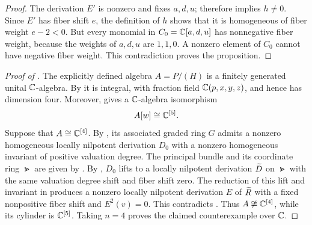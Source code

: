 \begin{proof}
The derivation $E'$ is nonzero and fixes $a,d,u$; therefore
 implies $h\ne0$.  Since $E'$ has fiber
shift $e$, the definition of $h$ shows that it is homogeneous
of fiber weight $e-2<0$.  But every monomial in
$C_0=\mathbb C[a,d,u]$ has nonnegative fiber weight, because the
weights of $a,d,u$ are $1,1,0$.  A nonzero element of $C_0$
cannot have negative fiber weight.  This contradiction proves
the proposition.
\end{proof}

\begin{proof}[Proof of ]
The explicitly defined algebra $A=P/(H)$ is a finitely
generated unital $\mathbb C$-algebra.  By  it is
integral, with fraction field $\mathbb C(p,x,y,z)$, and hence has
dimension four.  Moreover, 
gives a $\mathbb C$-algebra isomorphism
\[
 A[w]\cong\mathbb C^{[5]}.
\]
Suppose that $A\cong\mathbb C^{[4]}$.  By
, its associated
graded ring $G$ admits a nonzero homogeneous locally nilpotent
derivation $D_0$ with a nonzero homogeneous invariant of
positive valuation degree.  The principal bundle and its
coordinate ring $\Gt$ are given by
.  By
, $D_0$ lifts to a locally
nilpotent derivation $\widetilde D$ on $\Gt$ with the same valuation
degree shift and fiber shift zero.  The reduction of this lift
and invariant in  produces
a nonzero locally nilpotent derivation $E$ of $\widetilde R$ with a
fixed nonpositive fiber shift and $E^2(v)=0$.  This contradicts
.  Thus $A\not\cong\mathbb C^{[4]}$, while
its cylinder is $\mathbb C^{[5]}$.  Taking $n=4$ proves the
claimed counterexample over $\mathbb C$.
\end{proof}
